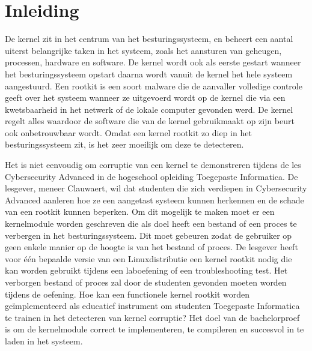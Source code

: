 


% 

\section{Inleiding}%
\label{sec:inleiding}
De kernel zit in het centrum van het besturingssysteem, en beheert een aantal uiterst belangrijke taken in het systeem, zoals het aansturen van geheugen, processen, hardware en software. De kernel wordt ook als eerste gestart wanneer het besturingssysteem opstart daarna wordt vanuit de kernel het hele systeem aangestuurd. Een rootkit is een soort malware die de aanvaller volledige controle geeft over het systeem wanneer ze uitgevoerd wordt op de kernel die via een kwetsbaarheid in het netwerk of de lokale computer gevonden werd. De kernel regelt alles waardoor de software die van de kernel gebruikmaakt op zijn beurt ook onbetrouwbaar wordt. Omdat een kernel rootkit zo diep in het besturingssysteem zit, is het zeer moeilijk om deze te detecteren. 

Het is niet eenvoudig om corruptie van een kernel te demonstreren tijdens de les Cybersecurity Advanced in de hogeschool opleiding Toegepaste Informatica. De lesgever, meneer Clauwaert, wil dat studenten die zich verdiepen in Cybersecurity Advanced aanleren hoe ze een aangetast systeem kunnen herkennen en de schade van een rootkit kunnen beperken. Om dit mogelijk te maken moet er een kernelmodule worden geschreven die als doel heeft een bestand of een proces te verbergen in het besturingssysteem. Dit moet gebeuren zodat de gebruiker op geen enkele manier op de hoogte is van het bestand of proces.
De lesgever heeft voor één bepaalde versie van een Linuxdistributie een kernel rootkit nodig die kan worden gebruikt tijdens een laboefening of een troubleshooting test. Het verborgen bestand of proces zal door de studenten gevonden moeten worden tijdens de oefening.
Hoe kan een functionele kernel rootkit worden geïmplementeerd als educatief instrument om studenten Toegepaste Informatica te trainen in het detecteren van kernel corruptie?
Het doel van de bachelorproef is om de kernelmodule correct te implementeren, te compileren en succesvol in te laden in het systeem.

